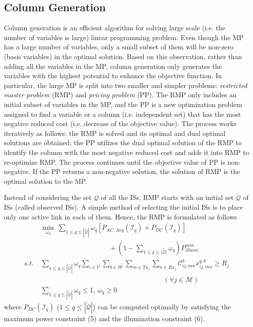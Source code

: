 \documentclass[10pt,journal]{IEEEtran}
\begin{document}
\subsection{Column Generation}
Column generation \cite{bertsimas1997introduction} is an efficient algorithm for solving large scale (i.e. the number of variables is large) linear programming problem. Even though the MP has a large number of variables, only a small subset of them will be non-zero (basis variables) in the optimal solution. Based on this observation, rather than adding all the variables in the MP, column generation only generates the variables with the highest potential to enhance the objective function. In particular, the large MP is split into two smaller and simpler problems: {\it restricted master problem} (RMP) and {\it pricing problem} (PP). The RMP only includes an initial subset of variables in the MP, and the PP is a new optimization problem assigned to find a variable or a column (i.e. independent set) that has the most negative reduced cost (i.e. decrease of the objective value). The process works iteratively as follows: the RMP is solved and its optimal and dual optimal solutions are obtained; the PP utilizes the dual optimal solution of the RMP to identify the column with the most negative reduced cost and adds it into RMP to re-optimize RMP. The process continues until the objective value of PP is non-negative. If the PP returns a non-negative solution, the solution of RMP is the optimal solution to the MP.

Instead of considering the set $\mathcal{Q}$ of all the ISs, RMP starts with an initial set $\tilde{\mathcal{Q}}$ of ISs (called observed ISs). A simple method of selecting the initial ISs is to place only one active link in each of them. Hence, the RMP is formulated as follows
\begin{align}
&\min_{\omega_{q}}~\sum_{1\leq q\leq|\tilde{\mathcal{Q}}|}\omega_{q}[P_{AC,Avg}(\mathcal{I}_{q})+P_{DC}(\mathcal{I}_{q})]\nonumber\\
& \qquad\qquad\qquad\qquad\qquad+(1-\sum_{1\leq q\leq|\tilde{\mathcal{Q}|}}\omega_{q})P_{illumi}^{min}\nonumber\\
s.t.~&\sum_{1\leq q\leq|\tilde{\mathcal{Q}}|}\omega_{q}\sum_{i\in\mathcal{V}}\sum_{b\in\mathcal{W}}\sum_{m\in Tx_{i}}\sum_{n\in Rx_{j}}\mathcal{C}_{ij,mn}^{b}x_{ij,mn}^{q,b}\geq R_{j}\nonumber\\
&\qquad\qquad\qquad \qquad\qquad\qquad\qquad\qquad\qquad (\forall j\in\mathcal{M})\nonumber\\
&\sum_{1\leq q\leq|\tilde{\mathcal{Q}}|}\omega_{q}\leq 1,~\omega_{q}\geq 0\nonumber
\end{align}
where $P_{DC}(\mathcal{I}_{q})$ ($1\leq q\leq|\tilde{\mathcal{Q}}|$) can be computed optimally by satisfying the maximum power constraint (5) and the illumination constraint (6).
\end{document}
